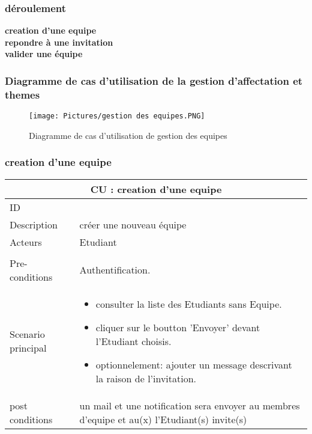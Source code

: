 \documentclass[11pt,fleqn]{book} %
\begin{document}
\subsubsection{déroulement}
\hspace{0.5cm}\textbf{creation  d'une equipe}\\
\hspace{0.5cm}\textbf{repondre à une invitation}\\
\hspace{0.5cm}\textbf{valider une équipe}\\


\subsubsection{Diagramme de cas d’utilisation de la gestion 
d'affectation et themes}
\begin{figure}[h]
    \centering
    \texttt{[image: Pictures/gestion des equipes.PNG]}
    \caption{Diagramme de cas d'utilisation de gestion des equipes}
    \label{fig:pca}
\end{figure}
\subsubsection{creation  d'une equipe}
\begin{center}
\begin{tabularx}{1\textwidth} { | p{4cm} | >{\raggedright\arraybackslash}X |  }
  \hline
  \multicolumn{2}{|c|}{CU : creation  d'une equipe} \\
 \hline
 ID & 1  \\
 \hline
 Description  & créer une nouveau équipe  \\
  \hline
 Acteurs  & Etudiant \\
  \hline   \\
 Pre-conditions  & Authentification.  \\
  \hline
 Scenario principal  & 
 \begin{itemize}
     \item  consulter la liste des Etudiants sans Equipe.
     \item cliquer sur le boutton ’Envoyer’ devant l’Etudiant choisis.
     \item optionnelement: ajouter un message descrivant la raison de l’invitation.
 \end{itemize}\\
  \hline
 post conditions  &  un mail et une notification sera envoyer au membres d’equipe et au(x) l’Etudiant(s) invite(s)  \\
  \hline
\end{tabularx}
\label{tbl:nicetablelesstable}
\end{center}
\end{document}
